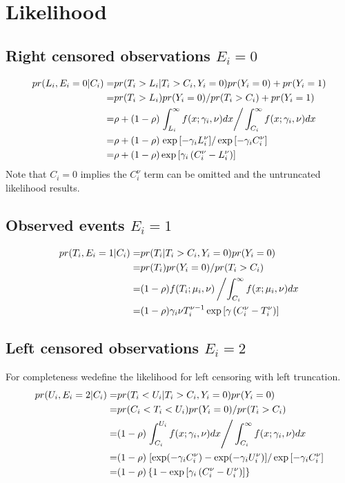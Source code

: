 \documentclass{article}
\begin{document}
\section{Likelihood}

\subsection{Right censored observations $E_i =0$}

\begin{align*}
pr(L_i, E_i=0 | C_i) =& pr(T_i > L_i | T_i > C_i, Y_i =0) pr(Y_i =0)  + pr(Y_i =1)\\
=&pr(T_i > L_i) pr(Y_i = 0)/pr(T_i > C_i) + pr(Y_i =1)\\
=& \rho + (1-\rho) \left. \int_{L_i}^\infty f(x;\gamma_i, \nu) dx \right/\int_{C_i}^\infty f(x;\gamma_i, \nu) dx  \\
= &  \rho + (1-\rho) \left. \exp\left[-\gamma_i L_i^\nu\right] \right/\exp\left[-\gamma_i C_i^\nu\right]\\
= &  \rho + (1-\rho) \exp\left[\gamma_i\left(C_i^\nu -L_i^\nu\right)\right] \\
\end{align*}
Note that $C_i=0$ implies the $C_i^\nu$ term can be omitted and the untruncated likelihood results.

\subsection{Observed events $E_i =1$}
\begin{align*}
pr(T_i, E_i=1 | C_i) =& pr(T_i  | T_i > C_i, Y_i =0)  pr(Y_i = 0) 
\\
=& 
 pr(T_i ) pr(Y_i = 0) /pr(T_i > C_i) \\
=&
 (1-\rho) f(T_i ; \mu_i, \nu) \left/ \int_{C_i}^\infty f(x;\mu_i, \nu) dx  \right.\\
=&
 (1-\rho) \gamma_i\nu T_i^{\nu-1} \exp\left[\gamma\left(C_i^\nu-T_i^\nu\right)\right]
\end{align*}
 
\subsection{Left censored observations $E_i =2$}
For completeness wedefine the likelihood for left censoring with left truncation.
\begin{align*}
pr(U_i, E_i=2 | C_i) =& pr(T_i < U_i | T_i > C_i, Y_i =0) pr(Y_i =0) \\
=&pr(C_i < T_i <U_i) pr(Y_i = 0)/pr(T_i > C_i) \\
=& (1-\rho) \left. \int_{C_i}^{U_i} f(x;\gamma_i, \nu) dx \right/\int_{C_i}^\infty f(x;\gamma_i, \nu) dx  \\
= &    (1-\rho) \left. \left[\exp(-\gamma_i C_i^\nu) - \exp(-\gamma_i U_i^\nu) \right] \right/\exp\left[-\gamma_i C_i^\nu\right]\\
= &  (1-\rho)\left\{1 -  \exp\left[\gamma_i\left(C_i^\nu -U_i^\nu\right)\right] \right\} \\
\end{align*}
\end{document}
